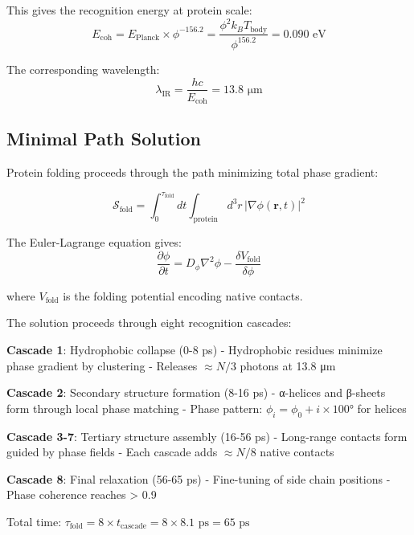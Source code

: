 \documentclass[12pt,a4paper]{article}
\begin{document}
{{This gives the recognition energy at protein scale:
\begin{equation}
E_{\text{coh}} = E_{\text{Planck}} \times \phi^{-156.2} = \frac{\phi^2 k_B T_{\text{body}}}{\phi^{156.2}} = 0.090 \text{ eV}
\end{equation}

The corresponding wavelength:
\begin{equation}
\lambda_{\text{IR}} = \frac{hc}{E_{\text{coh}}} = 13.8 \text{ μm}
\end{equation}

\subsection{Minimal Path Solution}

Protein folding proceeds through the path minimizing total phase gradient:

\begin{equation}
\mathcal{S}_{\text{fold}} = \int_0^{\tau_{\text{fold}}} dt \int_{\text{protein}} d^3r \, |\nabla\phi(\mathbf{r}, t)|^2
\end{equation}

The Euler-Lagrange equation gives:
\begin{equation}
\frac{\partial \phi}{\partial t} = D_{\phi} \nabla^2 \phi - \frac{\delta V_{\text{fold}}}{\delta \phi}
\end{equation}

where $V_{\text{fold}}$ is the folding potential encoding native contacts.

The solution proceeds through eight recognition cascades:

\textbf{Cascade 1}: Hydrophobic collapse (0-8 ps)
- Hydrophobic residues minimize phase gradient by clustering
- Releases $\approx N/3$ photons at 13.8 μm

\textbf{Cascade 2}: Secondary structure formation (8-16 ps)
- α-helices and β-sheets form through local phase matching
- Phase pattern: $\phi_i = \phi_0 + i \times 100°$ for helices

\textbf{Cascade 3-7}: Tertiary structure assembly (16-56 ps)
- Long-range contacts form guided by phase fields
- Each cascade adds $\approx N/8$ native contacts

\textbf{Cascade 8}: Final relaxation (56-65 ps)
- Fine-tuning of side chain positions
- Phase coherence reaches > 0.9

Total time: $\tau_{\text{fold}} = 8 \times t_{\text{cascade}} = 8 \times 8.1 \text{ ps} = 65 \text{ ps}$

}}
\end{document}

